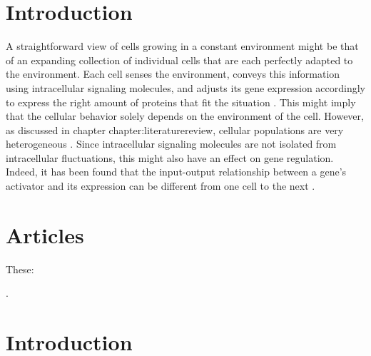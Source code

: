 \section{Introduction}


A straightforward view of cells growing in a constant environment might be 
that of an expanding collection of individual cells that are each perfectly adapted to the environment.
%
Each cell senses the environment, 
conveys this information using intracellular signaling molecules, 
and adjusts its gene expression accordingly to 
express the right amount of proteins that fit the situation \cite{Bray1995, Alon2006, Alon2007, Tyson2010}.
%
This might imply that the cellular behavior solely depends on the environment of the cell.
%
However, as discussed in chapter {chapter:literaturereview}, cellular populations are very heterogeneous \cite{Kiviet2014, Hashimoto2016}.
%
Since intracellular signaling molecules are not isolated from intracellular fluctuations, 
this might also have an effect on gene regulation.
%
Indeed, it has been found that the input-output relationship between a gene's activator and its expression can be different from one cell to the next \cite{Rosenfeld2005, Keegstra2017}.

\section{Articles}

These: 

\cite{Brandman2008}
\cite{Rosenfeld2007}
\cite{Zambrano2015}
\cite{Howell2012}
\cite{Nevozhay2009}
\cite{Hornung2008}
\cite{Dublanche2006}
\cite{Becskei2000}
\cite{Swain2004}
\cite{Bowsher2013}
\cite{Avery2006}
\cite{Maheshri2007}
\cite{Levine2007a}
\cite{Bennett2008a}
\cite{Smits2006}
\cite{Balazsi2011}
\cite{Raj2008}
\cite{Davidson2008}
\cite{Elowitz2002}
\cite{Bruggeman2009}
\cite{Kitano2004a}
.



\section{Introduction}



